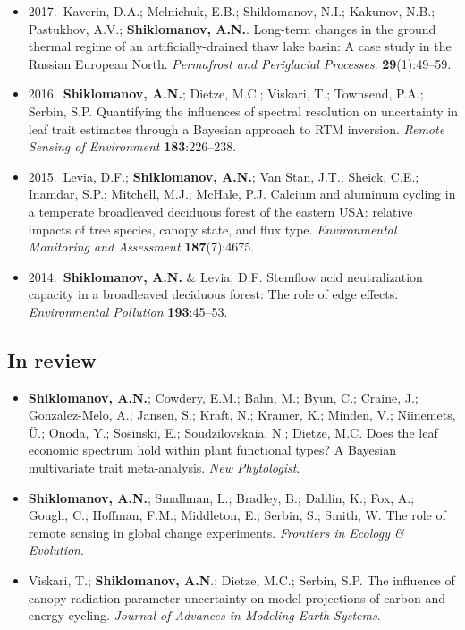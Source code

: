 \begin{itemize}
  \item 2017.~Kaverin, D.A.; Melnichuk, E.B.; Shiklomanov, N.I.; Kakunov, N.B.; Pastukhov, A.V.; \textbf{Shiklomanov, A.N.}.
    Long-term changes in the ground thermal regime of an artificially-drained thaw lake basin: A case study in the Russian European North.
    \textit{Permafrost and Periglacial Processes}. \textbf{29}(1):49--59.

  \item 2016.~\textbf{Shiklomanov, A.N.}; Dietze, M.C.; Viskari, T.; Townsend, P.A.; Serbin, S.P. 
    Quantifying the influences of spectral resolution on uncertainty in leaf trait estimates through a Bayesian approach to RTM inversion. 
    \textit{Remote Sensing of Environment} \textbf{183}:226--238. 

  \item 2015.~Levia, D.F.; \textbf{Shiklomanov, A.N.}; Van Stan, J.T.; Sheick, C.E.; Inamdar, S.P.; Mitchell, M.J.; McHale, P.J. 
    Calcium and aluminum cycling in a temperate broadleaved deciduous forest of the eastern USA\@: relative impacts of tree species, canopy state, and flux type. 
    \textit{Environmental Monitoring and Assessment} \textbf{187}(7):4675. 

  \item 2014.~\textbf{Shiklomanov, A.N.} \& Levia, D.F. 
    Stemflow acid neutralization capacity in a broadleaved deciduous forest: The role of edge effects. 
    \textit{Environmental Pollution} \textbf{193}:45--53. 
\end{itemize}

\subsection*{In review}

\begin{itemize}
  \item \textbf{Shiklomanov, A.N.}; Cowdery, E.M.; Bahn, M.; Byun, C.; Craine, J.; Gonzalez-Melo, A.; Jansen, S.; Kraft, N.; Kramer, K.; Minden, V.; Niinemets, Ü.; Onoda, Y.; Sosinski, E.; Soudzilovskaia, N.; Dietze, M.C. 
    Does the leaf economic spectrum hold within plant functional types? A Bayesian multivariate trait meta-analysis.
    \textit{New Phytologist}.

  \item \textbf{Shiklomanov, A.N.}; Smallman, L.; Bradley, B.; Dahlin, K.; Fox, A.; Gough, C.; Hoffman, F.M.; Middleton, E.; Serbin, S.; Smith, W. The role of remote sensing in global change experiments. \textit{Frontiers in Ecology \& Evolution}.

  \item Viskari, T.; \textbf{Shiklomanov, A.N}.; Dietze, M.C.; Serbin, S.P. The influence of canopy radiation parameter uncertainty on model projections of carbon and energy cycling.
    \textit{Journal of Advances in Modeling Earth Systems}.
\end{itemize}


